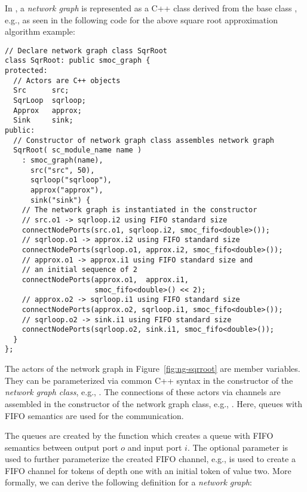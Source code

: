 In \SysteMoC{}, a \emph{network graph} is represented as a C++ class derived from the base class , e.g., as seen in the following code for the above square root approximation algorithm example:
{\small
\begin{verbatim}
// Declare network graph class SqrRoot
class SqrRoot: public smoc_graph {
protected:
  // Actors are C++ objects
  Src      src;     
  SqrLoop  sqrloop; 
  Approx   approx;  
  Sink     sink;    
public:
  // Constructor of network graph class assembles network graph
  SqrRoot( sc_module_name name )
    : smoc_graph(name),
      src("src", 50),
      sqrloop("sqrloop"),
      approx("approx"),
      sink("sink") {
    // The network graph is instantiated in the constructor
    // src.o1 -> sqrloop.i2 using FIFO standard size
    connectNodePorts(src.o1, sqrloop.i2, smoc_fifo<double>());
    // sqrloop.o1 -> approx.i2 using FIFO standard size
    connectNodePorts(sqrloop.o1, approx.i2, smoc_fifo<double>());
    // approx.o1 -> approx.i1 using FIFO standard size and
    // an initial sequence of 2
    connectNodePorts(approx.o1,  approx.i1,
                     smoc_fifo<double>() << 2);
    // approx.o2 -> sqrloop.i1 using FIFO standard size
    connectNodePorts(approx.o2, sqrloop.i1, smoc_fifo<double>());
    // sqrloop.o2 -> sink.i1 using FIFO standard size
    connectNodePorts(sqrloop.o2, sink.i1, smoc_fifo<double>());
  }
};
\end{verbatim}}

The actors of the network graph in Figure~\ref{fig:ng-sqrroot} are member variables.
They can be parameterized via common C++ syntax in the constructor of the \emph{network graph class}, e.g., .
The connections of these actors via channels are assembled in the constructor of the network graph class, e.g., .
Here, queues with FIFO semantics are used for the communication.

The queues are created by the  function which creates a queue with FIFO semantics between output port $o$ and input port $i$.
The optional parameter  is used to further parameterize the created FIFO channel, e.g.,  is used to create a FIFO channel for  tokens of depth one with an initial token of value two.
More formally, we can derive the following definition for a \emph{network graph}:

